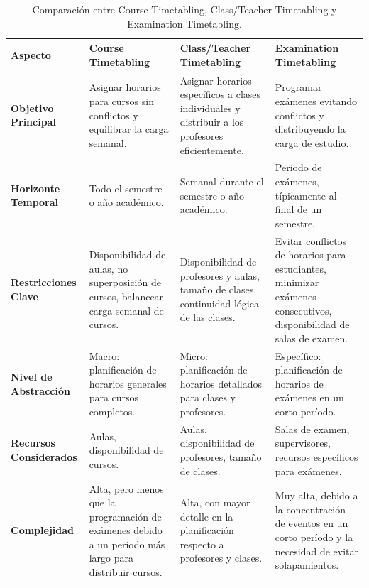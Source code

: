 \begin{landscape}
    

\begin{table}[h!]
    \centering
    \renewcommand{\arraystretch}{1.2}
    \begin{tabular}{|p{4cm}|p{4cm}|p{4cm}|p{4cm}|}
    \hline
    \textbf{Aspecto} & \textbf{Course Timetabling} & \textbf{Class/Teacher Timetabling} & \textbf{Examination Timetabling} \\ \hline
    
    \textbf{Objetivo Principal} & 
    Asignar horarios para cursos sin conflictos y equilibrar la carga semanal. & 
    Asignar horarios específicos a clases individuales y distribuir a los profesores eficientemente. & 
    Programar exámenes evitando conflictos y distribuyendo la carga de estudio. \\ \hline
    
    \textbf{Horizonte Temporal} & 
    Todo el semestre o año académico. & 
    Semanal durante el semestre o año académico. & 
    Periodo de exámenes, típicamente al final de un semestre. \\ \hline
    
    \textbf{Restricciones Clave} & 
    Disponibilidad de aulas, no superposición de cursos, balancear carga semanal de cursos. & 
    Disponibilidad de profesores y aulas, tamaño de clases, continuidad lógica de las clases. & 
    Evitar conflictos de horarios para estudiantes, minimizar exámenes consecutivos, disponibilidad de salas de examen. \\ \hline
    
    \textbf{Nivel de Abstracción} & 
    Macro: planificación de horarios generales para cursos completos. & 
    Micro: planificación de horarios detallados para clases y profesores. & 
    Específico: planificación de horarios de exámenes en un corto período. \\ \hline
    
    \textbf{Recursos Considerados} & 
    Aulas, disponibilidad de cursos. & 
    Aulas, disponibilidad de profesores, tamaño de clases. & 
    Salas de examen, supervisores, recursos específicos para exámenes. \\ \hline
    
    \textbf{Complejidad} & 
    Alta, pero menos que la programación de exámenes debido a un período más largo para distribuir cursos. & 
    Alta, con mayor detalle en la planificación respecto a profesores y clases. & 
    Muy alta, debido a la concentración de eventos en un corto período y la necesidad de evitar solapamientos. \\ \hline
    
    \end{tabular}
    \caption{Comparación entre Course Timetabling, Class/Teacher Timetabling y Examination Timetabling.}
    \label{tab:comparison}
    \end{table}
\end{landscape}
\newpage
